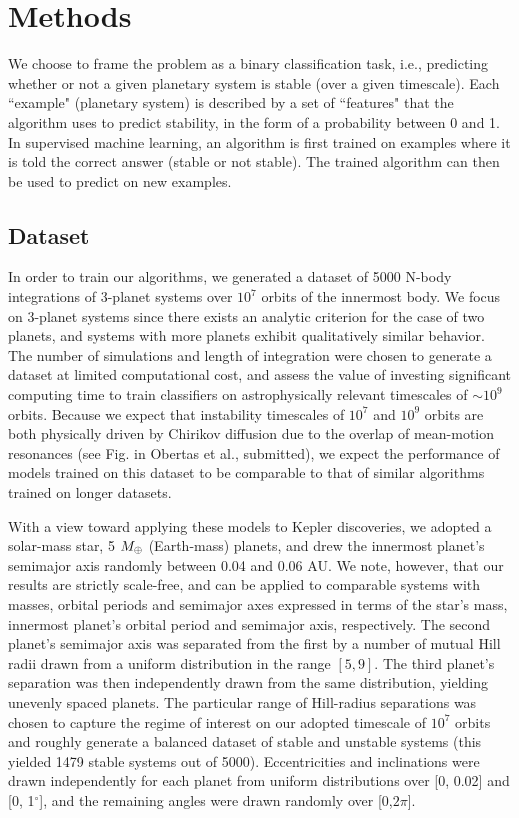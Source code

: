 \section{Methods}
We choose to frame the problem as a binary classification task, i.e., predicting whether or not a given planetary system is stable (over a given timescale).
Each ``example" (planetary system) is described by a set of ``features" that the algorithm uses to predict stability, in the form of a probability between 0 and 1.
In supervised machine learning, an algorithm is first trained on examples where it is told the correct answer (stable or not stable).
The trained algorithm can then be used to predict on new examples.

\subsection{Dataset} \label{dataset}
In order to train our algorithms, we generated a dataset of 5000 N-body integrations of 3-planet systems over $10^7$ orbits of the innermost body.
We focus on 3-planet systems since there exists an analytic criterion for the case of two planets, and systems with more planets exhibit qualitatively similar behavior.
The number of simulations and length of integration were chosen to generate a dataset at limited computational cost, and assess the value of investing significant computing time to train classifiers on astrophysically relevant timescales of $\sim 10^9$ orbits.
Because we expect that instability timescales of $10^7$ and $10^9$ orbits are both physically driven by Chirikov diffusion due to the overlap of mean-motion resonances (see Fig. in Obertas et al., submitted), we expect the performance of models trained on this dataset to be comparable to that of similar algorithms trained on longer datasets.

With a view toward applying these models to Kepler discoveries, we adopted a solar-mass star, 5 $M_\oplus$ (Earth-mass) planets, and drew the innermost planet's semimajor axis randomly between 0.04 and 0.06 AU.
We note, however, that our results are strictly scale-free, and can be applied to comparable systems with masses, orbital periods and semimajor axes expressed in terms of the star's mass, innermost planet's orbital period and semimajor axis, respectively.
The second planet's semimajor axis was separated from the first by a number of mutual Hill radii drawn from a uniform distribution in the range $[5,9]$.  
The third planet's separation was then independently drawn from the same distribution, yielding unevenly spaced planets.
The particular range of Hill-radius separations was chosen to capture the regime of interest on our adopted timescale of $10^7$ orbits and roughly generate a balanced dataset of stable and unstable systems (this yielded 1479 stable systems out of 5000).
Eccentricities and inclinations were drawn independently for each planet from uniform distributions over [0, 0.02] and [0, 1$^\circ$], and the remaining angles were drawn randomly over [0,$2\pi$].

